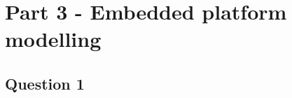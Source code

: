 \documentclass[12pt]{article} %
\begin{document}


\section{Part 3 - Embedded platform modelling}

\subsection{Question 1}
\end{document}
